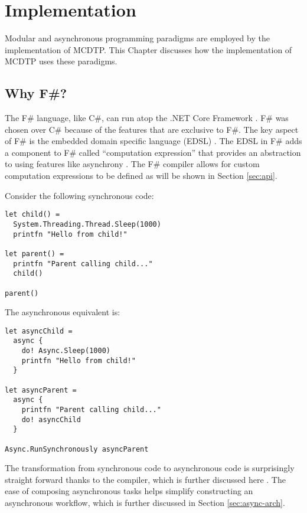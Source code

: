 \chapter{Implementation}\label{chp:impl}

Modular and asynchronous programming paradigms are employed by the implementation of MCDTP. This Chapter discusses how the implementation of MCDTP uses these paradigms.

\section{Why F\#?}

The F\# language, like C\#, can run atop the .NET Core Framework \cite{Leijen2009}\cite{syme2011f}. F\# was chosen over C\# because of the features that are exclusive to F\#. The key aspect of F\# is the embedded domain specific language (EDSL) \cite{syme2011f}. The EDSL in F\# adds a component to F\# called ``computation expression'' that provides an abstraction to using features like asynchrony \cite{syme2011f}. The F\# compiler allows for custom computation expressions to be defined as will be shown in Section \ref{sec:api}.

Consider the following synchronous code:

\begin{lstlisting}[caption=Synchronous F\# Example,label={lst:sync}]
let child() =
  System.Threading.Thread.Sleep(1000)
  printfn "Hello from child!"

let parent() =
  printfn "Parent calling child..."
  child()

parent()
\end{lstlisting}

The asynchronous equivalent is:

\begin{lstlisting}[caption=Asynchronous F\# Example,label={lst:async}]
let asyncChild =
  async {
    do! Async.Sleep(1000)
    printfn "Hello from child!"
  }

let asyncParent =
  async {
    printfn "Parent calling child..."
    do! asyncChild
  }

Async.RunSynchronously asyncParent
\end{lstlisting}

The transformation from synchronous code to asynchronous code is surprisingly straight forward thanks to the compiler, which is further discussed here \cite{syme2011f}. The ease of composing asynchronous tasks helps simplify constructing an asynchronous workflow, which is further discussed in Section \ref{sec:async-arch}.

